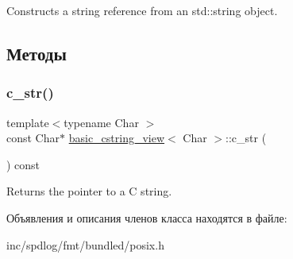 Constructs a string reference from an {\ttfamily std\+::string} object.  

\subsection{Методы}
\mbox{\label{classbasic__cstring__view_a19ace9be4e7617e5a978df29113279ee}} 
\subsubsection{\texorpdfstring{c\+\_\+str()}{c\_str()}}
{\footnotesize\ttfamily template$<$typename Char $>$ \\
const Char$\ast$ \hyperlink{classbasic__cstring__view}{basic\+\_\+cstring\+\_\+view}$<$ Char $>$\+::c\+\_\+str (\begin{DoxyParamCaption}{ }\end{DoxyParamCaption}) const\hspace{0.3cm}{\ttfamily [inline]}}

Returns the pointer to a C string. 

Объявления и описания членов класса находятся в файле\+:\begin{DoxyCompactItemize}
\item 
inc/spdlog/fmt/bundled/posix.\+h\end{DoxyCompactItemize}

